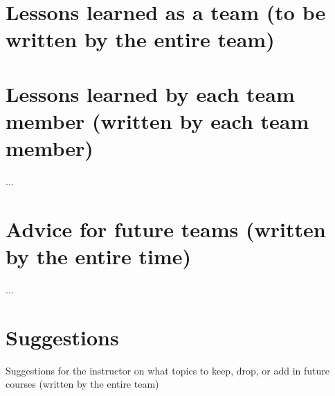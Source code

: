 \section{Lessons learned as a team (to be written by the entire team)}
\section{Lessons learned by each team member (written by each team member)}
...
\section{Advice for future teams (written by the entire time)}
...
\section{Suggestions}
Suggestions for the instructor on what topics to keep, drop, or add in future courses (written by the entire team)
